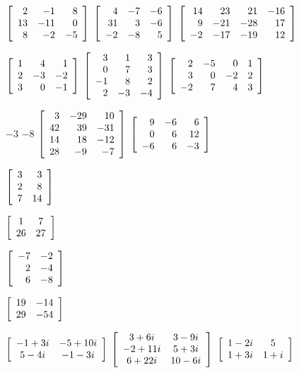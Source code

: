 \begin{enumerate}[!HW!, start=1]
\begin{multicols}{3}
\itemspade $\mtx{rrr}{2&-1&8\\13&-11&0\\8&-2&-5}$
\itemspade $\mtx{rrr}{4&-7&-6\\31&3&-6\\-2&-8&5}$
\itemspade $\mtx{rrrr}{14&23&21&-16\\9&-21&-28&17\\-2&-17&-19&12}$
\end{multicols}
\begin{multicols}{3}
\itemspade $\mtx{rrr}{1&4&1\\2&-3&-2\\3&0&-1}$
\itemspade $\mtx{rrr}{3&1&3\\0&7&3\\-1&8&2\\2&-3&-4}$
\itemspade $\mtx{rrrr}{2&-5&0&1\\3&0&-2&2\\-2&7&4&3}$
\end{multicols}
\begin{multicols}{3}
\itemspade $-3$
\itemspade $-8$\mbox{}\vfill\mbox{}\columnbreak
\itemspade $\mtx{rrr}{3&-29&10\\42&39&-31\\14&18&-12\\28&-9&-7}$
\itemspade $\mtx{rrr}{9&-6&6\\0&6&12\\-6&6&-3}$
\end{multicols}
\begin{multicols}{4}
\item $\mtx{rr}{3&3\\2&8\\7&14}$ %
\item $\mtx{cc}{1&7\\26&27}$ %
\item $\mtx{rrr}{-7&-2\\2&-4\\6&-8}$ %
\item $\mtx{rrr}{19&-14\\29&-54}$ %
\end{multicols}
\begin{multicols}{3}
\itemspade $\mtx{cc}{-1+3i & -5+10i \\ 5-4i & -1-3i}$
\itemspade $\mtx{cc}{3+6i & 3-9i\\-2+11i & 5+3i\\ 6+22i & 10-6i}$
\itemspade $\mtx{cc}{1-2i & 5\\ 1+3i & 1+i}$

\end{multicols}
\end{enumerate}
